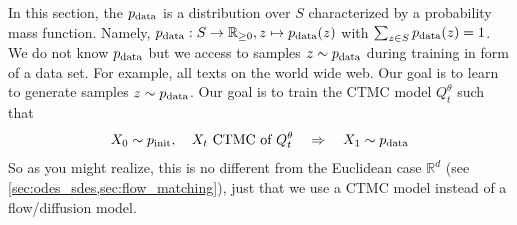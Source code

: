 In this section, the  $p_{\rm{data}}$ is a distribution over $S$ characterized by a probability mass function. Namely, $p_{\rm{data}}:S\to\mathbb{R}_{\geq 0}, z\mapsto p_{\rm{data}}(z)$ with $\sum_{z\in S}p_{\rm{data}}(z)=1$. We do not know $p_{\rm{data}}$ but we access to samples $z\sim p_{\rm{data}}$ during training in form of a data set. For example, all texts on the world wide web. Our goal is to learn to generate samples $z\sim p_{\rm{data}}$. Our goal is to train the CTMC model $Q_t^\theta$ such that 
\begin{align*}
X_0\sim p_{\rm{init}}, \quad X_t\text{ CTMC of }Q_t^\theta\quad \Rightarrow \quad X_{1}\sim p_{\rm{data}}
\end{align*}
So as you might realize, this is no different from the Euclidean case $\mathbb{R}^d$ (see \cref{sec:odes_sdes,sec:flow_matching}), just that we use a CTMC model instead of a flow/diffusion model.

